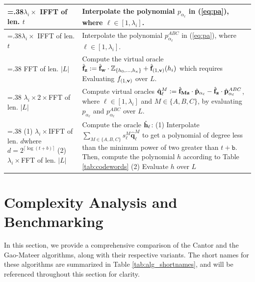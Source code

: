 \begin{table}
{\begin{tabularx}{\linewidth}{>{\hsize=.38\hsize}XX}
			\midrule
			$\lambda_i \times$ IFFT of len. $t$ & Interpolate the polynomial $p_{\alpha_\ell}$ in (\ref{eq:pa}), where $\ell \in [1,\lambda_i]$. 
			\\
			\midrule
			$\lambda_i \times$ IFFT of len. $t$ & Interpolate the polynomial $p^{ABC}_{\alpha_\ell}$ in (\ref{eq:pa}), where $\ell \in [1,\lambda_i]$. 
			\\
			\midrule
			FFT of len. $|L|$ & Compute the virtual oracle $\hat{{\bf{f}}}_{\bf{z}} := \hat{{\bf{f}}}_{\bf{w}} \cdot \mathbb{Z}_{\{h_0,\dots, h_{\kappa}\}} + \hat{{\bf{f}}}_{(1,{\bf{v}})}(h_i)$ which requires 
			Evaluating $f_{(1,{\bf{v}})}$ over $L$.
			\\
			\midrule
			$\lambda_i \times 2 \times $FFT of len. $|L|$ & Compute virtual oracles $\hat{\mathbf{q}}_\ell^M := \hat{{\bf{f}}}_{\mathbf{Mz}}\cdot \hat{\mathbf{p}}_{\alpha_\ell} - \hat{{\bf{f}}}_{\bf{z}} \cdot \hat{\mathbf{p}}^{ABC}_{\alpha_\ell} $, where $\ell \in [1,\lambda_i]$ and $M \in \{A, B, C\}$, by evaluating $p_{\alpha_\ell}$ and $p^{ABC}_{\alpha_\ell}$ over $L$.
			\\
			\midrule
			(1) $\lambda_i \times $IFFT of len. $d$\newline where $d = 2^{\lceil\log(t+b)\rceil}$ \newline
			(2) $\lambda_i \times $FFT of len.
			$|L|$
			& Compute the oracle $\hat{{\bf{h}}}_\ell$:\newline
			(1) Interpolate $\sum_{M \in \{A, B, C\}} s^M_\ell \hat{\mathbf{q}}_\ell^M$ to get a  polynomial of degree less than the minimum power of two greater than $t + \texttt{b}$.%
			Then, compute the polynomial $h$ according to Table \ref{tab:codewords}\newline
			(2) Evaluate $h$ over $L$
			\\
			\bottomrule
		\end{tabularx}
	}
\end{table}




\section{Complexity Analysis and Benchmarking}\label{Sec:ComplexityAnalysis}
In this section, we provide a comprehensive comparison of the Cantor and the Gao-Mateer algorithms, along with their respective variants. The short names for these algorithms are summarized in Table \ref{tab:alg_shortnames}, and will be referenced throughout this section for clarity.  


